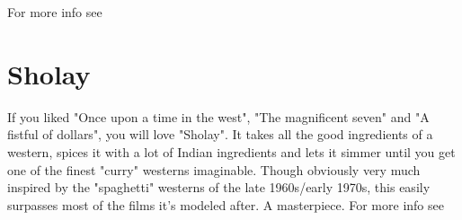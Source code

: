 \documentclass{article}
\begin{document}
For more info see \cite{indiatimes-article}

\section{Sholay}
If you liked "Once upon a time in the west", "The magnificent seven" and "A fistful of dollars", you will love "Sholay". It takes all the good ingredients of a western, spices it with a lot of Indian ingredients and lets it simmer until you get one of the finest "curry" westerns imaginable. Though obviously very much inspired by the "spaghetti" westerns of the late 1960s/early 1970s, this easily surpasses most of the films it's modeled after. A masterpiece.
For more info see \cite{imdb-article}




\end{document}
